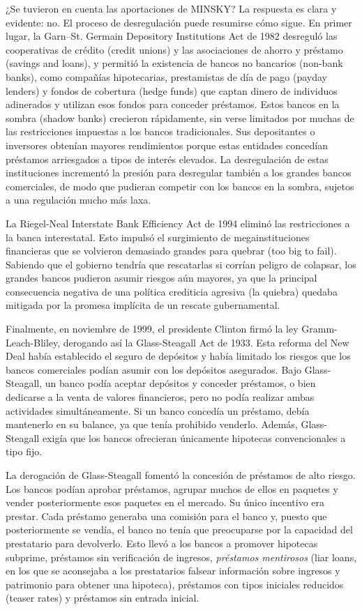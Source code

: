 \documentclass[10pt,a4paper]{article}
\begin{document}
¿Se tuvieron en cuenta las aportaciones de MINSKY? La respuesta es clara y evidente: no. El proceso de desregulación puede resumirse cómo sigue.
En primer lugar, la Garn–St. Germain Depository Institutions Act de 1982 desreguló las cooperativas de crédito (credit unions) y las asociaciones de ahorro y préstamo (savings and loans), y permitió la existencia de bancos no bancarios (non-bank banks), como compañías hipotecarias, prestamistas de día de pago (payday lenders) y fondos de cobertura (hedge funds) que captan dinero de individuos adinerados y utilizan esos fondos para conceder préstamos. Estos bancos en la sombra (shadow banks) crecieron rápidamente, sin verse limitados por muchas de las restricciones impuestas a los bancos tradicionales. Sus depositantes o inversores obtenían mayores rendimientos porque estas entidades concedían préstamos arriesgados a tipos de interés elevados. La desregulación de estas instituciones incrementó la presión para desregular también a los grandes bancos comerciales, de modo que pudieran competir con los bancos en la sombra, sujetos a una regulación mucho más laxa.

La Riegel-Neal Interstate Bank Efficiency Act de 1994 eliminó las restricciones a la banca interestatal. Esto impulsó el surgimiento de megainstituciones financieras que se volvieron demasiado grandes para quebrar (too big to fail). Sabiendo que el gobierno tendría que rescatarlas si corrían peligro de colapsar, los grandes bancos pudieron asumir riesgos aún mayores, ya que la principal consecuencia negativa de una política crediticia agresiva (la quiebra) quedaba mitigada por la promesa implícita de un rescate gubernamental.

Finalmente, en noviembre de 1999, el presidente Clinton firmó la ley Gramm-Leach-Bliley, derogando así la Glass-Steagall Act de 1933. Esta reforma del New Deal había establecido el seguro de depósitos y había limitado los riesgos que los bancos comerciales podían asumir con los depósitos asegurados. Bajo Glass-Steagall, un banco podía aceptar depósitos y conceder préstamos, o bien dedicarse a la venta de valores financieros, pero no podía realizar ambas actividades simultáneamente. Si un banco concedía un préstamo, debía mantenerlo en su balance, ya que tenía prohibido venderlo. Además, Glass-Steagall exigía que los bancos ofrecieran únicamente hipotecas convencionales a tipo fijo.

La derogación de Glass-Steagall fomentó la concesión de préstamos de alto riesgo. Los bancos podían aprobar préstamos, agrupar muchos de ellos en paquetes y vender posteriormente esos paquetes en el mercado. Su único incentivo era prestar. Cada préstamo generaba una comisión para el banco y, puesto que posteriormente se vendía, el banco no tenía que preocuparse por la capacidad del prestatario para devolverlo. Esto llevó a los bancos a promover hipotecas subprime, préstamos sin verificación de ingresos, \textit{préstamos mentirosos} (liar loans, en los que se aconsejaba a los prestatarios falsear información sobre ingresos y patrimonio para obtener una hipoteca), préstamos con tipos iniciales reducidos (teaser rates) y préstamos sin entrada inicial.
\end{document}
